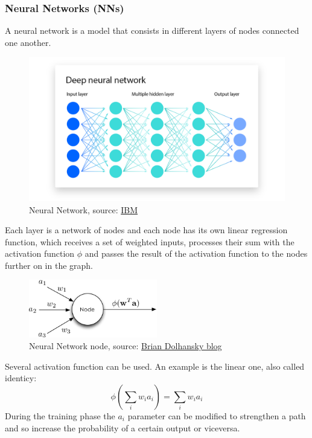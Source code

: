 \documentclass[12pt]{article}
\begin{document}
    \subsubsection{Neural Networks (NNs)}
A neural network is a model that consists in different layers of nodes connected one another.\begin{figure}[H]
\centering
        \includegraphics[width=1.3\textwidth]{DeepNeuralNetwork.png}
\caption{Neural Network, source: \href{https://www.ibm.com/topics/neural-networks}{IBM}}
\label{fig:nodeNN}
\end{figure}
Each layer is a network of nodes and each node has its own linear regression function, which receives a set of weighted inputs, processes their sum with the activation function $\phi$ and passes the result of the activation function to the nodes further on in the graph. 
    \begin{figure}[H]
    \centering
            \includegraphics[width=0.5\textwidth]{nodeNN.png}
    \caption{Neural Network node, source: \href{https://www.briandolhansky.com/blog/artificial-neural-networks-linear-regression-part-1}{Brian Dolhansky blog}}
    \end{figure}
Several activation function can be used. An example is the linear one, also called identicy:
$$ \phi \left( \sum_i w_i a_i \right) =  \sum_i w_i a_i $$
During the training phase the $a_i$ parameter can be modified to strengthen a path and so increase the probability of a certain output or viceversa.\\
\end{document}
